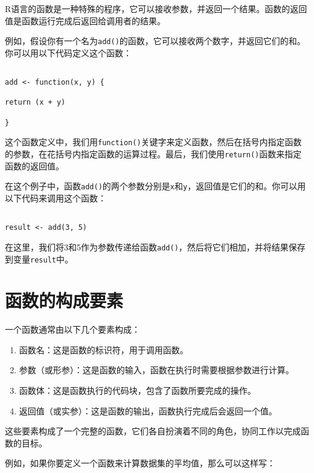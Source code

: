 \documentclass[
  letterpaper,
  DIV=11,
  numbers=noendperiod]{scrreprt}
\begin{document}
R语言的函数是一种特殊的程序，它可以接收参数，并返回一个结果。函数的返回值是函数运行完成后返回给调用者的结果。

例如，假设你有一个名为\texttt{add()}的函数，它可以接收两个数字，并返回它们的和。你可以用以下代码定义这个函数：

\begin{verbatim}

add <- function(x, y) {

return (x + y)

}
\end{verbatim}

这个函数定义中，我们用\texttt{function()}关键字来定义函数，然后在括号内指定函数的参数，在花括号内指定函数的运算过程。最后，我们使用\texttt{return()}函数来指定函数的返回值。

在这个例子中，函数\texttt{add()}的两个参数分别是\texttt{x}和\texttt{y}，返回值是它们的和。你可以用以下代码来调用这个函数：

\begin{verbatim}

result <- add(3, 5)
\end{verbatim}

在这里，我们将3和5作为参数传递给函数\texttt{add()}，然后将它们相加，并将结果保存到变量\texttt{result}中。

\hypertarget{ux51fdux6570ux7684ux6784ux6210ux8981ux7d20}{%
\section{函数的构成要素}\label{ux51fdux6570ux7684ux6784ux6210ux8981ux7d20}}

一个函数通常由以下几个要素构成：

\begin{enumerate}
\def\labelenumi{\arabic{enumi}.}
\item
  函数名：这是函数的标识符，用于调用函数。
\item
  参数（或形参）：这是函数的输入，函数在执行时需要根据参数进行计算。
\item
  函数体：这是函数执行的代码块，包含了函数所要完成的操作。
\item
  返回值（或实参）：这是函数的输出，函数执行完成后会返回一个值。
\end{enumerate}

这些要素构成了一个完整的函数，它们各自扮演着不同的角色，协同工作以完成函数的目标。

例如，如果你要定义一个函数来计算数据集的平均值，那么可以这样写：
\end{document}
